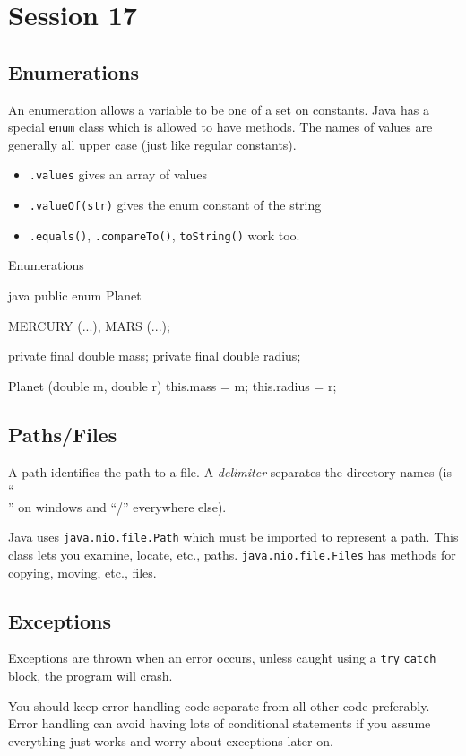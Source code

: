 \section{Session 17}\label{sec:session_17}

\subsection{Enumerations}\label{sub:enumerations}

An enumeration allows a variable to be one of a set on constants.
Java has a special \texttt{enum} class which is allowed to have methods.
The names of values are generally all upper case (just like regular constants).

\begin{itemize}
    \item \texttt{.values} gives an array of values
    \item \texttt{.valueOf(str)} gives the enum constant of the string
    \item \texttt{.equals()}, \texttt{.compareTo()}, \texttt{toString()} work too.
\end{itemize}

\begin{highlight}{Enumerations}
    \begin{code}{java}
        public enum Planet {
            MERCURY (...),
            MARS (...);

            private final double mass;
            private final double radius;

            Planet (double m, double r) {
                this.mass = m;
                this.radius = r;
                }
            }
    \end{code}
\end{highlight}

\subsection{Paths/Files}\label{sub:paths_files}

A path identifies the path to a file.
A \emph{delimiter} separates the directory names (is ``\\'' on windows and ``/'' everywhere else).

Java uses \texttt{java.nio.file.Path} which must be imported to represent a path.
This class lets you examine, locate, etc., paths.
\texttt{java.nio.file.Files} has methods for copying, moving, etc., files.

\subsection{Exceptions}\label{sub:exceptions}

Exceptions are thrown when an error occurs, unless caught using a \texttt{try} \texttt{catch} block, the program will crash.

You should keep error handling code separate from all other code preferably.
Error handling can avoid having lots of conditional statements if you assume everything just works and worry about exceptions later on.
